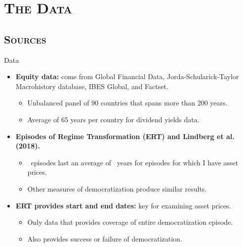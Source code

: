 

\section{\scshape The Data}

\subsection{\scshape Sources}


\begin{frame}{Data}
	\begin{itemize}
		\item<1-> \textbf{Equity data:} come from Global Financial Data, Jorda-Schularick-Taylor Macrohistory database, IBES Global, and Factset.
		\begin{itemize}
			\vspace{.10cm}
			\item<1->[--] Unbalanced panel of 90 countries that spans more than 200 years.
			\vspace{.10cm}
			\item<1->[--] Average of 65 years per country for dividend yields data.
		\end{itemize}
		\vspace{.5cm}	
		\item<2-> \textbf{Episodes of Regime Transformation (ERT) and Lindberg et al. (2018).}
		\vspace{.10cm}
		\begin{itemize}
		\item<2->[--] \tabOnecolOneND\ episodes last an average of \demEpisodeLength\ years for episodes for which I have asset prices.
		\vspace{.10cm}
		\item<2->[--] Other measures of democratization produce similar results.
		\end{itemize}
		\vspace{.5cm}	
		\item<3-> \textbf{ERT provides start and end dates:} key for examining asset prices.
		\vspace{.10cm}
		\begin{itemize}
			\item<3->[--] Only data that provides coverage of entire democratization episode.
		\vspace{.10cm}
			\item<3->[--] Also provides success or failure of democratization.
		\end{itemize}
	\end{itemize}

\end{frame}

